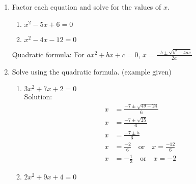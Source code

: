 \documentclass[12pt, twoside]{article}
\begin{document}
\begin{enumerate}
  \item Factor each equation and solve for the values of $x$.
  \begin{multicols}{2}
    \begin{enumerate}[itemsep=5cm]
    \item $x^2-5x+6=0$
    \item $x^2-4x-12=0$
  \end{enumerate}
  \end{multicols} \vspace{5cm}

Quadratic formula: For $ax^2+bx+c=0$, $\displaystyle x=\frac{-b \pm \sqrt{b^2-4ac}}{2a}$
\item Solve using the quadratic formula. (example given)
\begin{multicols}{2}
  \begin{enumerate}[itemsep=5cm]
    \item $3x^2 + 7x + 2 = 0$ \\[0.5cm]
    Solution:
      \begin{align*}
        x &= \frac{-7 \pm \sqrt{49 - 24}}{6} \\
        x &= \frac{-7 \pm \sqrt{25}}{6} \\
        x &= \frac{-7 \pm 5}{6} \\
        x &= \frac{-2}{6} \quad \text{or} \quad x = \frac{-12}{6} \\
        x &= -\frac{1}{3} \quad \text{or} \quad x = -2
      \end{align*}
     \item $2x^2 + 9x + 4 = 0$
  \end{enumerate}
  \end{multicols} \vspace{4cm}


\end{enumerate}
\end{document}
